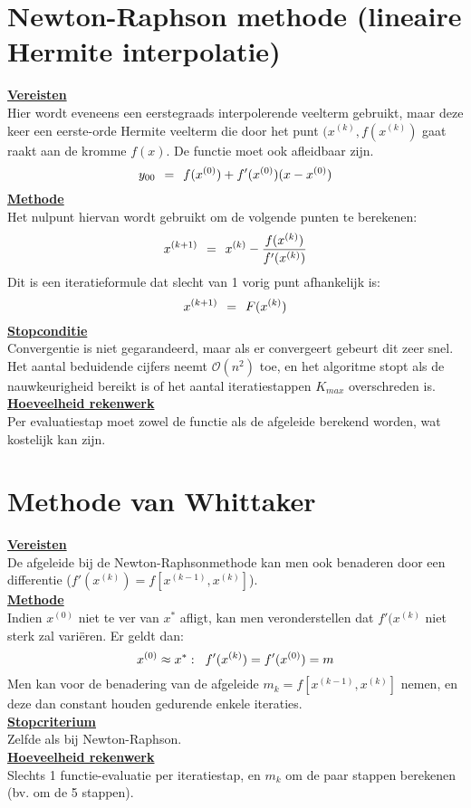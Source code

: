 \documentclass[11pt]{report}
\def \eq {\hspace{1.5mm}=\hspace{1.5mm}}
\def \h {\hspace{2mm}}
\def \v {\vspace{2mm}}
\begin{document}
\section{Newton-Raphson methode (lineaire Hermite interpolatie)}
	\underline{\textbf{Vereisten}}\\
	Hier wordt eveneens een eerstegraads interpolerende veelterm gebruikt, maar deze keer een eerste-orde Hermite veelterm die door het punt $(x^{(k)}, f(x^{(k)})$ gaat raakt aan de kromme $f(x)$. De functie moet ook afleidbaar zijn.
	$$y_{00} \eq f(x^{(0)}) + f'(x^{(0)})(x - x^{(0)})$$
	\underline{\textbf{Methode}}\\
	Het nulpunt hiervan wordt gebruikt om de volgende punten te berekenen:
	\begin{equation}
		x^{(k+1)} \eq x^{(k)} - \frac{f(x^{(k)})}{f'(x^{(k)})}
	\end{equation}
	Dit is een iteratieformule dat slecht van 1 vorig punt afhankelijk is:
	$$x^{(k+1)} \eq F(x^{(k)})$$
	\underline{\textbf{Stopconditie}}\\
	Convergentie is niet gegarandeerd, maar als er convergeert gebeurt dit zeer snel. Het aantal beduidende cijfers neemt $\mathcal O(n^2)$ toe, en het algoritme stopt als de nauwkeurigheid bereikt is of het aantal iteratiestappen $K_{max}$ overschreden is.\v\\
	\underline{\textbf{Hoeveelheid rekenwerk}}\\
	Per evaluatiestap moet zowel de functie als de afgeleide berekend worden, wat kostelijk kan zijn.
	
\section{Methode van Whittaker}
	\underline{\textbf{Vereisten}}\\
	De afgeleide bij de Newton-Raphsonmethode kan men ook benaderen door een differentie ($f'(x^{(k)}) = f[x^{(k-1)}, x^{(k)}]$).\v\\
	\underline{\textbf{Methode}}\\
	Indien $x^{(0)}$ niet te ver van $x^*$ afligt, kan men veronderstellen dat $f'(x^{(k)}$ niet sterk zal vari\"{e}ren. Er geldt dan:
	$$x^{(0)} \approx x^*: \h f'(x^{(k)}) = f'(x^{(0)}) = m$$
	Men kan voor de benadering van de afgeleide $m_k =  f[x^{(k-1)}, x^{(k)}]$ nemen, en deze dan constant houden gedurende enkele iteraties.\v\\
	\underline{\textbf{Stopcriterium}}\\
	Zelfde als bij Newton-Raphson.\v\\
	\underline{\textbf{Hoeveelheid rekenwerk}}\\
	Slechts 1 functie-evaluatie per iteratiestap, en $m_k$ om de paar stappen berekenen (bv. om de 5 stappen).
	
\end{document}
